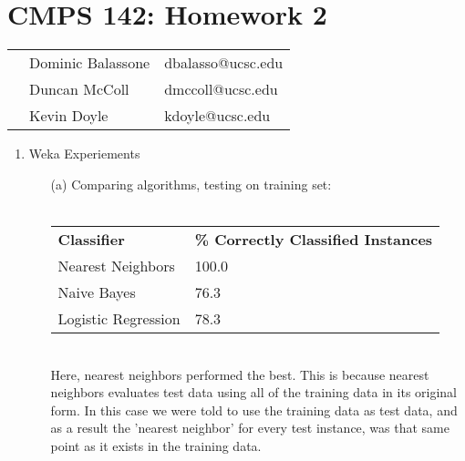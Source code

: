 \documentclass[12pt]{article}
\begin{document}
\section*{CMPS 142: Homework 2}

\begin{tabular}{p{8cm} l l}
    & Dominic Balassone & dbalasso@ucsc.edu \\
    & Duncan McColl & dmccoll@ucsc.edu\\
    & Kevin Doyle 	& kdoyle@ucsc.edu \\
\end{tabular}
    
\begin{enumerate}
  \item Weka Experiements
  
  \begin{enumerate}
  	\item[(a)] Comparing algorithms, testing on training set: \\ \\
  		\begin{tabular}{l l}
  			\textbf{Classifier} & \textbf{\% Correctly Classified Instances} \\
  			Nearest Neighbors & 100.0 \\
  			Naive Bayes & 76.3 \\
  			Logistic Regression & 78.3
  	
  		\end{tabular} \\
  		
  		Here, nearest neighbors performed the best. This is because nearest neighbors evaluates test data using all of the training data in its original form. In this case we were told to use the training data as test data, and as a result the 'nearest neighbor' for every test instance, was that same point as it exists in the training data.
  		

\end{enumerate}
\end{enumerate}
\end{document}
